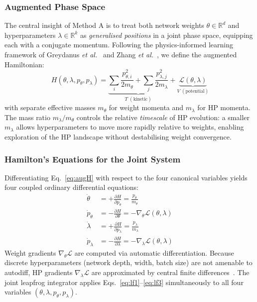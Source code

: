 \documentclass[12pt,a4paper]{article}
\begin{document}
\subsubsection{Augmented Phase Space}

The central insight of Method A is to treat both network weights
$\theta \in \mathbb{R}^d$ and hyperparameters
$\lambda \in \mathbb{R}^k$ as \emph{generalised positions} in a joint
phase space, equipping each with a conjugate momentum.  Following the
physics-informed learning framework of Greydanus
\emph{et al.}~\cite{greydanus2019} and Zhang \emph{et al.}~\cite{zhang2025},
we define the augmented Hamiltonian:
\begin{equation}
H(\theta,\lambda,p_\theta,p_\lambda)
  = \underbrace{\sum_i\frac{p_{\theta,i}^2}{2m_\theta}
    + \sum_j\frac{p_{\lambda,j}^2}{2m_\lambda}}_{T\;(\text{kinetic})}
  + \underbrace{\mathcal{L}(\theta,\lambda)}_{V\;(\text{potential})}
\label{eq:augH}
\end{equation}
with separate effective masses $m_\theta$ for weight momenta and
$m_\lambda$ for HP momenta.  The mass ratio $m_\lambda / m_\theta$
controls the relative \emph{timescale} of HP evolution: a smaller
$m_\lambda$ allows hyperparameters to move more rapidly relative to
weights, enabling exploration of the HP landscape without destabilising
weight convergence.

\subsubsection{Hamilton's Equations for the Joint System}

Differentiating Eq.~\eqref{eq:augH} with respect to the four
canonical variables yields four coupled ordinary differential
equations:
\begin{align}
\dot\theta      &= +\frac{\partial H}{\partial p_\theta}
                 = \frac{p_\theta}{m_\theta}
\label{eq:heq1}\\
\dot{p}_\theta  &= -\frac{\partial H}{\partial \theta}
                 = -\nabla_\theta\mathcal{L}(\theta,\lambda)
\label{eq:heq2}\\
\dot\lambda     &= +\frac{\partial H}{\partial p_\lambda}
                 = \frac{p_\lambda}{m_\lambda}
\label{eq:heq3}\\
\dot{p}_\lambda &= -\frac{\partial H}{\partial \lambda}
                 = -\nabla_\lambda\mathcal{L}(\theta,\lambda)
\label{eq:heq4}
\end{align}
Weight gradients $\nabla_\theta\mathcal{L}$ are computed via
automatic differentiation.  Because discrete hyperparameters (network
depth, width, batch size) are not amenable to autodiff, HP gradients
$\nabla_\lambda\mathcal{L}$ are approximated by central finite
differences~\cite{rathore2024}.  The joint leapfrog integrator applies
Eqs.~\eqref{eq:lf1}--\eqref{eq:lf3} simultaneously to all four
variables $(\theta, \lambda, p_\theta, p_\lambda)$.
\end{document}
